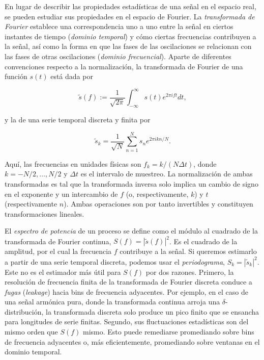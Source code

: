 \documentclass[10pt,a4paper]{book}
\begin{document}
\bigskip

En lugar de describir las propiedades estadísticas de una señal en el espacio real, se pueden estudiar sus propiedades en el espacio de Fourier. La \emph{transformada de Fourier} establece una correspondencia uno a uno entre la señal en ciertos instantes de tiempo (\emph{dominio temporal}) y cómo ciertas frecuencias contribuyen a la señal, así como la forma en que las fases de las oscilaciones se relacionan con las fases de otras oscilaciones (\emph{dominio frecuencial}). Aparte de diferentes convenciones respecto a la normalización, la transformada de Fourier de una función $s(t)$ está dada por

\begin{equation}
\tilde{s}(f) := \frac{1}{\sqrt{2\pi}} \int_{-\infty}^{\infty} s(t) e^{2\pi i f t} dt,
\tag{2.7}
\end{equation}

y la de una serie temporal discreta y finita por

\begin{equation}
\tilde{s}_k = \frac{1}{\sqrt{N}} \sum_{n=1}^N s_n e^{2\pi i k n / N}.
\tag{2.8}
\end{equation}

Aquí, las frecuencias en unidades físicas son $f_k = k / (N \Delta t)$, donde $k = -N/2, \ldots, N/2$ y $\Delta t$ es el intervalo de muestreo. La normalización de ambas transformadas es tal que la transformada inversa solo implica un cambio de signo en el exponente y un intercambio de $f$ (o, respectivamente, $k$) y $t$ (respectivamente $n$). Ambas operaciones son por tanto invertibles y constituyen transformaciones lineales.

El \emph{espectro de potencia} de un proceso se define como el módulo al cuadrado de la transformada de Fourier continua, $S(f) = |\tilde{s}(f)|^2$. Es el cuadrado de la amplitud, por el cual la frecuencia $f$ contribuye a la señal. Si queremos estimarlo a partir de una serie temporal discreta, podemos usar el \emph{periodograma}, $S_k = |\tilde{s}_k|^2$. Este no es el estimador más útil para $S(f)$ por dos razones. Primero, la resolución de frecuencia finita de la transformada de Fourier discreta conduce a \emph{fugas} (\emph{leakage}) hacia bins de frecuencia adyacentes. Por ejemplo, en el caso de una señal armónica pura, donde la transformada continua arroja una $\delta$-distribución, la transformada discreta solo produce un pico finito que se ensancha para longitudes de serie finitas. Segundo, sus fluctuaciones estadísticas son del mismo orden que $S(f)$ mismo. Esto puede remediarse promediando sobre bins de frecuencia adyacentes o, más eficientemente, promediando sobre ventanas en el dominio temporal.  
\end{document}
